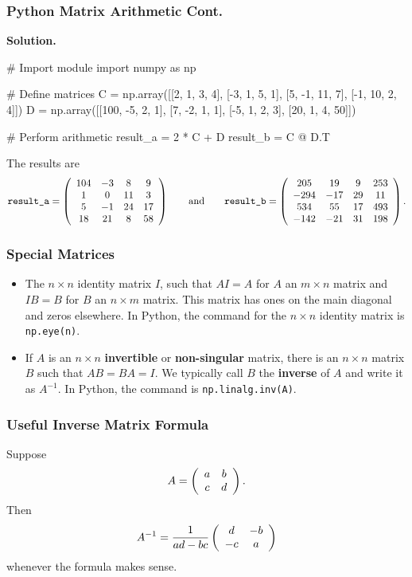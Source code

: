\documentclass{beamer}
\begin{document}
\begin{frame}[fragile]
\frametitle{Python Matrix Arithmetic Cont.}
{\bf Solution.}  
{\tiny
\begin{verbatim*}
# Import module
import numpy as np

# Define matrices
C = np.array([[2, 1, 3, 4], [-3, 1, 5, 1], [5, -1, 11, 7], [-1, 10, 2, 4]])
D = np.array([[100, -5, 2, 1], [7, -2, 1, 1], [-5, 1, 2, 3], [20, 1, 4, 50]])

# Perform arithmetic 
result_a = 2 * C + D
result_b = C @ D.T
\end{verbatim*}

The results are
$$
\texttt{result\_a}  = \left(\begin{array}{c c c c} 104	&	-3	&	8	&	9\\	1	&	0	&	11	&	3\\ 5	&	-1	&	24	&	17\\	18	&	21	&	8	&	58 \end{array}\right)
\qquad\text{and}\qquad 
\texttt{result\_b}	= \left(\begin{array}{c c c c} 205	&	19	&	9	&	253\\	-294	&	-17	&	29	&	11\\ 534	&	55	&	17	&	493\\	-142	&	-21	&	31	&	198 \end{array}\right).
$$
}
\end{frame}

\begin{frame}
\frametitle{Special Matrices}
\begin{itemize} 
\item The $n\times n$ identity matrix $I$, such that $A I = A$ for $A$ an $m\times n$ matrix and $I B = B$ for $B$ an $n\times m$ matrix. This matrix has ones on the main diagonal and zeros elsewhere. In Python, the command for the $n\times n$ identity matrix is \texttt{np.eye(n)}.
\item If $A$ is an $n\times n$ {\bf invertible} or {\bf non-singular} matrix, there is an $n\times n$ matrix $B$ such that $AB = BA = I$. We typically call $B$ the {\bf inverse} of $A$ and write it as $A^{-1}$. In Python, the command is \texttt{np.linalg.inv(A)}.
\end{itemize}
\end{frame}

\begin{frame}
\frametitle{Useful Inverse Matrix Formula}
Suppose
$$
A = \left(\begin{array}{c c} a	& 	b\\	c	&	d\end{array}\right).
$$
Then
$$
A^{-1} = \frac{1}{ad -bc}\left(\begin{array}{c c}	d	&	-b\\	-c	&	a\end{array}\right)
$$
whenever the formula makes sense.
\end{frame}
\end{document}
